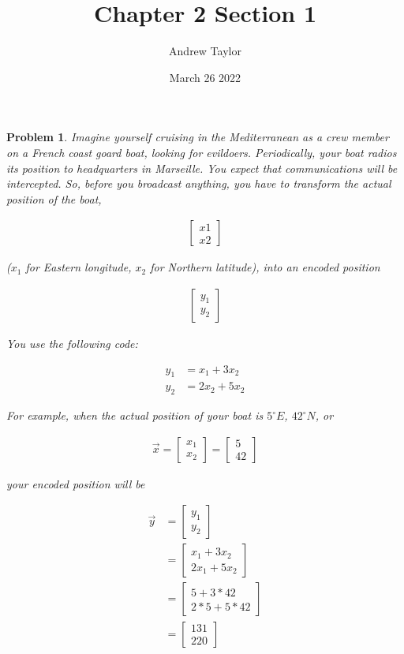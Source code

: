 \documentclass{article}
\title{Chapter 2 Section 1}
\author{Andrew Taylor}
\date{March 26 2022}
\newtheorem{problem}{Problem}
\begin{document}
\maketitle

\begin{problem}
Imagine yourself cruising in the Mediterranean as a crew member on a French coast goard boat, looking for evildoers. Periodically, your boat radios its position to headquarters in Marseille. You expect that communications will be intercepted. So, before you broadcast anything, you have to transform the actual position of the boat,

\begin{align*}
\begin{bmatrix}
x1 \\ x2
\end{bmatrix}
\end{align*}

($x_{1}$ for Eastern longitude, $x_{2}$ for Northern latitude), into an encoded position

\begin{align*}
\begin{bmatrix}
y_{1} \\ y_{2}
\end{bmatrix}
\end{align*}

You use the following code:

\begin{align*}
y_{1} &= x_{1} + 3x_{2} \\
y_{2} &= 2x_{2} + 5x_{2}
\end{align*}

For example, when the actual position of your boat is $5^\circ E$, $42^\circ N$, or

\begin{align*}
\vec{x} = \begin{bmatrix} x_{1} \\ x_{2} \end{bmatrix} = \begin{bmatrix} 5 \\ 42 \end{bmatrix}
\end{align*}

your encoded position will be 

\begin{align*}
\vec{y} 
&= \begin{bmatrix} y_{1} \\ y_{2} \end{bmatrix} \\
&= \begin{bmatrix} 
x_{1} + 3x_{2} \\ 
2x_{1} + 5x_{2} 
\end{bmatrix} \\
&= \begin{bmatrix}
5 + 3 * 42 \\ 2 * 5 + 5 * 42
\end{bmatrix} \\
&= \begin{bmatrix} 
131 \\ 220
\end{bmatrix}
\end{align*}


\end{problem}
\end{document}
